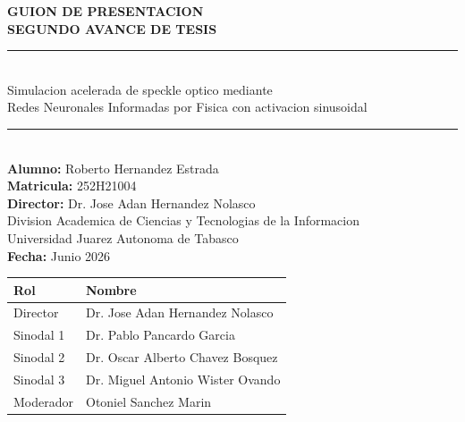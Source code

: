 \documentclass[12pt,a4paper]{article}
\begin{document}

\thispagestyle{empty}
\begin{center}
  \vspace*{1.5cm}
  {\Large\bfseries\color{ujatblue}
    GUION DE PRESENTACION\\[6pt]
    SEGUNDO AVANCE DE TESIS}\\[12pt]
  \rule{\textwidth}{1.5pt}\\[8pt]
  {\large Simulacion acelerada de speckle optico mediante\\
   Redes Neuronales Informadas por Fisica con activacion sinusoidal}\\[8pt]
  \rule{\textwidth}{1.5pt}\\[16pt]
  {\normalsize
    \textbf{Alumno:} Roberto Hernandez Estrada\\
    \textbf{Matricula:} 252H21004\\
    \textbf{Director:} Dr. Jose Adan Hernandez Nolasco\\[8pt]
    Division Academica de Ciencias y Tecnologias de la Informacion\\
    Universidad Juarez Autonoma de Tabasco\\[8pt]
    \textbf{Fecha:} Junio 2026
  }\\[24pt]
\end{center}

\begin{tcolorbox}[colback=slidelightblue!30, colframe=ujatblue,
                  title={\bfseries Comite Evaluador}, coltitle=white]
\begin{tabular}{@{}ll@{}}
  \toprule
  \textbf{Rol} & \textbf{Nombre} \\
  \midrule
  Director & Dr. Jose Adan Hernandez Nolasco \\
  Sinodal 1 & Dr. Pablo Pancardo Garcia \\
  Sinodal 2 & Dr. Oscar Alberto Chavez Bosquez \\
  Sinodal 3 & Dr. Miguel Antonio Wister Ovando \\
  Moderador & Otoniel Sanchez Marin \\
  \bottomrule
\end{tabular}
\end{tcolorbox}

\vspace{12pt}

\tableofcontents
\newpage


\clearpage

\clearpage

\end{document}
